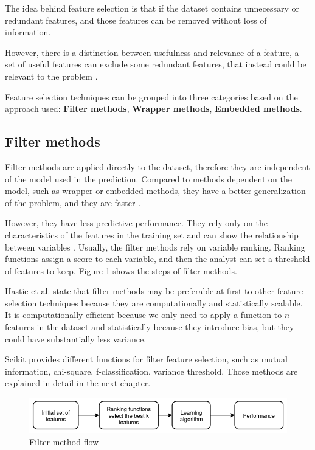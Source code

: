 The idea behind feature selection is that if the dataset contains unnecessary or redundant features, and those features can be removed without loss of information. \cite{bermingham2015application}

However, there is a distinction between usefulness and relevance of a feature, a set of useful features can exclude some redundant features, that instead could be relevant to the problem \cite{kohavi1997wrappers}.

Feature selection techniques can be grouped into three categories based on the approach used: \textbf{Filter methods}, \textbf{Wrapper methods}, \textbf{Embedded methods}.

\subsection{Filter methods}
Filter methods \cite{kohavi1997wrappers} are applied directly to the dataset, therefore they are independent of the model used in the prediction. Compared to methods dependent on the model, such as wrapper or embedded methods, they have a better generalization of the problem, and they are faster .

However, they have less predictive performance.  They rely only on the characteristics of the features in the training set and can show the relationship between variables \cite{sanchez2007filter}.
Usually, the filter methods rely on variable ranking. Ranking functions assign a score to each variable, and then the analyst can set a threshold of features to keep. Figure \ref{fig:filter} shows the steps of filter methods.

Hastie et al. \cite{hastie2009elements} state that filter methods may be preferable at first to other feature selection techniques because they are computationally and statistically scalable.  It is computationally efficient because we only need to apply a function to $n$ features in the dataset and statistically because they introduce bias, but they could have substantially less variance.

Scikit provides different functions for filter feature selection, such as mutual information, chi-square, f-classification, variance threshold. Those methods are explained in detail in the next chapter.

\begin{figure}[!h]
	\centering
	\includegraphics[width=1.0\columnwidth]{filter2.png}
	\caption{Filter method flow}
	\label{fig:filter}
\end{figure}


